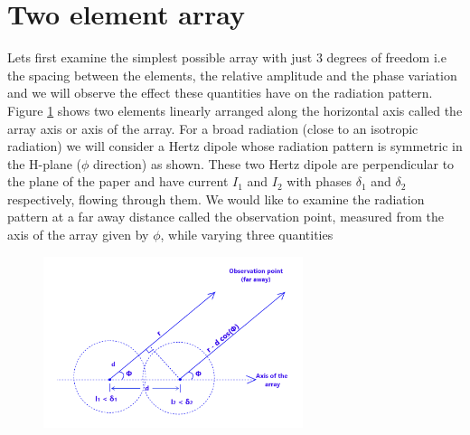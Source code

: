 \section{Two element array}
Lets first examine the simplest possible array with just 3 degrees of freedom i.e the spacing between the elements, the relative amplitude and the phase variation and we will observe the effect these quantities have on the radiation pattern. Figure \ref{52.2} shows two elements linearly arranged along the horizontal axis called the array axis or axis of the array. For a broad radiation (close to an isotropic radiation) we will consider a Hertz dipole whose radiation pattern is symmetric in the H-plane ($\phi$ direction) as shown. These two Hertz dipole are perpendicular to the plane of the paper and have current $I_1$ and $I_2$ with phases $\delta_1$ and $\delta_2$ respectively, flowing through them. We would like to examine the radiation pattern at a far away distance called the observation point, measured from the axis of the array given by $\phi$, while varying three quantities
\begin{figure}[h]
\centering
\includegraphics[height=5cm]{./graphics/fig52_2}
\caption{}
\label{52.2}
\end{figure}

